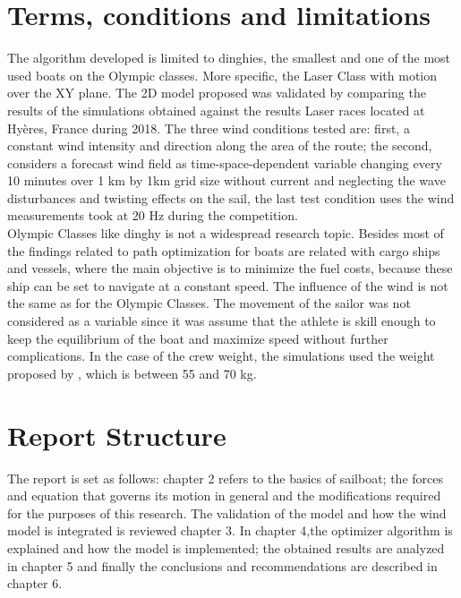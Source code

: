  \section{Terms, conditions and limitations}
The algorithm developed is limited to dinghies, the smallest and one of the most used boats on the Olympic classes. More specific, the Laser Class with motion over the XY plane.  The 2D model proposed was validated by comparing the results of the simulations obtained against the results Laser races located at Hyères, France during 2018. The three wind conditions tested are: first, a constant wind intensity and direction along the area of the route; the second, considers a forecast wind field as time-space-dependent variable changing every 10 minutes over 1 km by 1km grid size without current and neglecting the wave disturbances and twisting effects on the sail, the last test condition uses the wind measurements took at 20 Hz during the competition. 
\\

Olympic Classes like dinghy is not a widespread research topic. Besides most of the findings related to path optimization for boats are related with cargo ships and vessels, where the main objective is to minimize the fuel costs, because these ship can be set to navigate at a constant speed. The influence of the wind is not the same as for the Olympic Classes. The movement of the sailor was not considered as a variable since it was assume that the athlete is skill enough to keep the equilibrium of the boat and  maximize speed without further complications. In the case of the crew weight, the simulations used the weight proposed by \cite{laser_opt}, which is between	55 and 70 kg.

 
 \section{Report Structure}
The report is set as follows: chapter 2 refers to the basics of sailboat; the forces and equation that governs its motion in general and the modifications required for the purposes of this research. The validation of the model and how the wind model is integrated is reviewed chapter 3. In chapter 4,the optimizer algorithm is explained and how the model is implemented;  the obtained results are analyzed in chapter 5 and finally the conclusions and recommendations are described in chapter 6.\\


